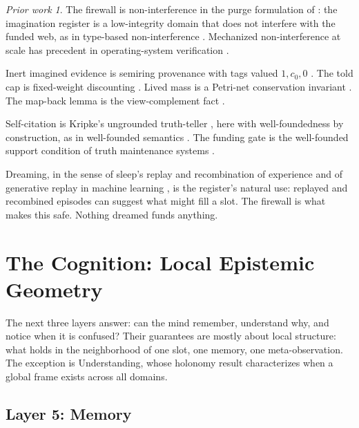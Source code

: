 \documentclass[11pt]{article}
\theoremstyle{remark}
\newtheorem*{prior}{Prior work}
\begin{document}
\begin{prior}
The firewall is non-interference in the purge formulation of \citet{GoguenMeseguer1982}:
the imagination register is a low-integrity domain that does not interfere with the funded
web, as in type-based non-interference \citep{VolpanoIrvineSmith1996,SabelfeldMyers2003}.
Mechanized non-interference at scale has precedent in operating-system verification
\citep{Murray2013}.

Inert imagined evidence is semiring provenance with tags valued $1, c_0, 0$
\citep{GreenKarvounarakisTannen2007}. The told cap is fixed-weight discounting
\citep{Josang2016}. Lived mass is a Petri-net conservation invariant \citep{Murata1989}.
The map-back lemma is the view-complement fact \citep{BancilhonSpyratos1981,Foster2007}.

Self-citation is Kripke's ungrounded truth-teller \citep{Kripke1975}, here with
well-foundedness by construction, as in well-founded semantics
\citep{VanGelderRossSchlipf1991}. The funding gate is the well-founded support condition
of truth maintenance systems \citep{Doyle1979,deKleer1986}.

Dreaming, in the sense of sleep's replay and recombination of experience
\citep{WalkerStickgold2004} and of generative replay in machine learning \citep{Shin2017}, is
the register's natural use: replayed and recombined episodes can suggest what might fill a
slot. The firewall is what makes this safe. Nothing dreamed funds anything.
\end{prior}


\section{The Cognition: Local Epistemic Geometry}
\label{sec:cognition}

The next three layers answer: can the mind remember, understand why, and notice when it is
confused? Their guarantees are mostly about local structure: what holds in the neighborhood
of one slot, one memory, one meta-observation. The exception is Understanding, whose
holonomy result characterizes when a global frame exists across all domains.

\subsection{Layer 5: Memory}
\end{document}
